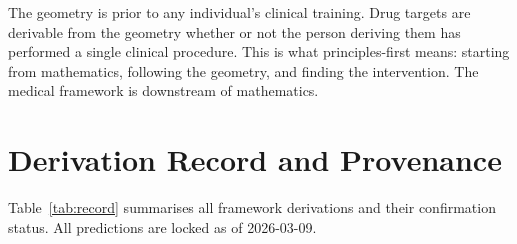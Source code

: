 \documentclass[12pt,a4paper]{article}
\begin{document}
The geometry is prior to any individual's clinical training.
Drug targets are derivable from the geometry whether or not
the person deriving them has performed a single clinical
procedure. This is what principles-first means: starting
from mathematics, following the geometry, and finding the
intervention. The medical framework is downstream of
mathematics.

\section{Derivation Record and Provenance}

Table~\ref{tab:record} summarises all framework derivations
and their confirmation status. All predictions are locked
as of 2026-03-09.
\end{document}
